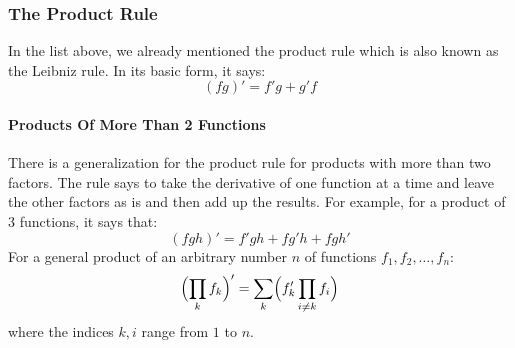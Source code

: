 



\subsubsection{The Product Rule}
In the list above, we already mentioned the product rule which is also known as the Leibniz rule. In its basic form, it says:
\begin{equation}
 (f g)'  = f' g + g' f
\end{equation}

\paragraph{Products Of More Than 2 Functions}

There is a generalization for the product rule for products with more than two factors. The rule says to take the derivative of one function at a time and leave the other factors as is and then add up the results. For example, for a product of 3 functions, it says that:
\begin{equation}
(fgh)' =  f' g h + f g' h + f g h'
\end{equation}
For a general product of an arbitrary number $n$ of functions $f_1, f_2, \ldots, f_n$:
\begin{equation}
\Bigl(  \prod_k f_k   \Bigr) '
= \sum_k \Bigl( f_k' \prod_{i \neq k} f_i  \Bigr) 
\end{equation}
where the indices $k,i$ range from $1$ to $n$.

